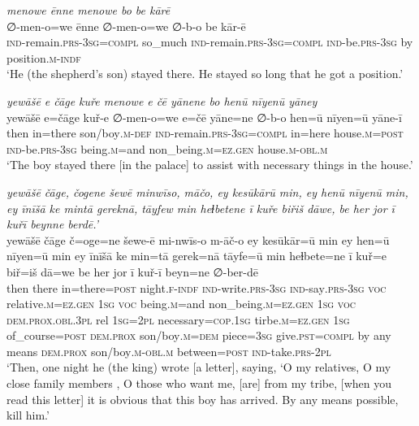\ea \label{KŠ.44}
\textit{menowe ēnne menowe bo be kārē} \\ 
\gll ∅-men-o=we ēnne ∅-men-o=we ∅-b-o be kār-ē \\ 
 \textsc{ind-}remain\textsc{.prs}\textsc{-3sg}\textsc{=compl} so\_much \textsc{ind-}remain\textsc{.prs}\textsc{-3sg}\textsc{=compl} \textsc{ind-}be\textsc{.prs}\textsc{-3sg} by position\textsc{.m}\textsc{-indf} \\ 
\glt `He (the shepherd’s son) stayed there. He stayed so long that he got a position.'
\z 
 
\ea \label{KŠ.49}
\textit{yewāšē e čāge kuře menowe e čē yānene bo henū nīyenū yāney} \\ 
\gll yewāšē e=čāge kuř-e ∅-men-o=we e=čē yāne=ne ∅-b-o hen=ū nīyen=ū yāne-ī \\ 
 then in=there son/boy\textsc{.m}\textsc{-def} \textsc{ind-}remain\textsc{.prs}\textsc{-3sg}\textsc{=compl} in=here house\textsc{.m}\textsc{=\textsc{post}} \textsc{ind-}be\textsc{.prs}\textsc{-3sg} being\textsc{.m}=and non\_being\textsc{.m}\textsc{=ez.gen} house\textsc{.m}\textsc{-obl}\textsc{.m} \\ 
\glt `The boy stayed there [in the palace] to assist with necessary things in the house.'
\z 
 
\ea \label{KŠ.56}
\textit{yewāšē čāge, čogene šewē minwīso, māčo, ey kesūkārū min, ey henū nīyenū min, ey īnīšā ke mintā gereknā, tāyfew min heɫbetene ī kuře biřiš dāwe, be her jor ī kuřī beynne berdē.’} \\ 
\gll yewāšē čāge č=oge=ne šewe-ē mi-nwīs-o m-āč-o ey kesūkār=ū min ey hen=ū nīyen=ū min ey īnīšā ke min=tā gerek=nā tāyfe=ū min heɫbete=ne ī kuř=e biř=iš dā=we be her jor ī kuř-ī beyn=ne ∅-ber-dē \\ 
 then there in=there\textsc{=\textsc{post}} night\textsc{.f}\textsc{-indf} \textsc{ind-}write\textsc{.prs}\textsc{-3sg} \textsc{ind-}say\textsc{.prs}\textsc{-3sg} \textsc{voc} relative\textsc{.m}\textsc{\textsc{=ez.gen}} \textsc{1sg} \textsc{voc} being\textsc{.m}=and non\_being\textsc{.m}\textsc{\textsc{=ez.gen}} \textsc{1sg} \textsc{voc} \textsc{dem.prox}\textsc{.obl}\textsc{.3pl} rel \textsc{1sg}=\textsc{2pl} necessary\textsc{=cop}\textsc{.\textsc{1sg}} tirbe\textsc{.m}\textsc{\textsc{=ez.gen}} \textsc{1sg} of\_course\textsc{=\textsc{post}} \textsc{dem.prox} son/boy\textsc{.m}\textsc{=dem} piece\textsc{=3sg} give\textsc{.pst}\textsc{=compl} by any means \textsc{dem.prox} son/boy\textsc{.m}\textsc{-obl}\textsc{.m} between\textsc{=\textsc{post}} \textsc{ind-}take\textsc{.prs}-\textsc{2pl} \\ 
\glt `Then, one night he (the king) wrote [a letter], saying, ‘O my relatives, O my close family members , O those who want me, [are] from my tribe, [when you read this letter] it is obvious that this boy has arrived. By any means possible, kill him.'
\z 
 
